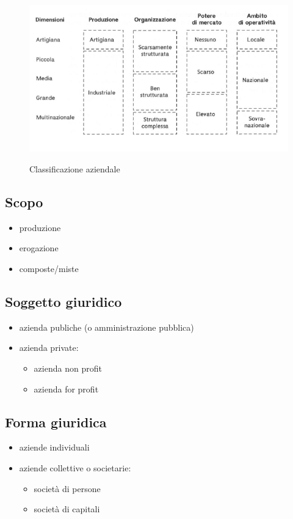 \begin{figure}[h!]
    \centering
    \includegraphics[width=0.5\linewidth]{img/2022-03-27-12-02-19.png}
    \label{fig:classificazione_aziendale}
    \caption{Classificazione aziendale}
\end{figure}
\subsection{Scopo}
\begin{itemize}
    \item produzione
    \item erogazione
    \item composte/miste
\end{itemize}
\subsection{Soggetto giuridico}
\begin{itemize}
    \item azienda publiche (o amministrazione pubblica)
    \item azienda private:
    \begin{itemize}
        \item azienda non profit
        \item azienda for profit
    \end{itemize}
\end{itemize}
\subsection{Forma giuridica}
\begin{itemize}
    \item aziende individuali
    \item aziende collettive o societarie:
    \begin{itemize}
        \item società di persone
        \item società di capitali
    \end{itemize}
\end{itemize}

